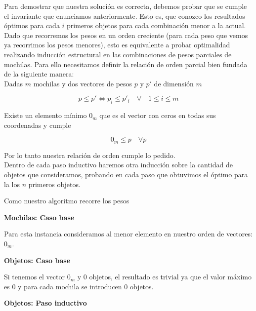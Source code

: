 Para demostrar que nuestra solución es correcta, debemos probar que se cumple el invariante que enunciamos anteriormente. Esto es, que conozco los resultados óptimos para cada $i$ primeros objetos para cada combinación menor a la actual. Dado que recorremos los pesos en un orden creciente (para cada peso que vemos ya recorrimos los pesos menores), esto es equivalente a probar optimalidad realizando inducción estructural en las combinaciones de pesos parciales de mochilas. Para ello necesitamos definir la relación de orden parcial bien fundada de la siguiente manera:
\\

Dadas $m$ mochilas y dos vectores de pesos $p$ y $p'$ de dimensión $m$

$$p \leq p' \Leftrightarrow p_i \leq p'_i \quad \forall \quad 1 \leq i \leq m$$

Existe un elemento mínimo $0_m$ que es el vector con ceros en todas sus coordenadas y cumple

$$0_m \leq p \quad \forall p$$

Por lo tanto nuestra relación de orden cumple lo pedido.
\\

Dentro de cada paso inductivo haremos otra inducción sobre la cantidad de objetos que consideramos, probando en cada paso que obtuvimos el óptimo para la los $n$ primeros objetos.

Como nuestro algoritmo recorre los pesos 

\vspace{5mm}

{\Large\textbf{Mochilas: Caso base}}

\vspace{5mm}

Para esta instancia consideramos al menor elemento en nuestro orden de vectores: $0_m$.

\vspace{5mm}

{\large\textbf{Objetos: Caso base}}

\vspace{5mm}

Si tenemos el vector $0_m$ y $0$ objetos, el resultado es trivial ya que el valor máximo es $0$ y para cada mochila se introducen $0$ objetos.

\vspace{5mm}

{\large\textbf{Objetos: Paso inductivo}}

\vspace{5mm}


